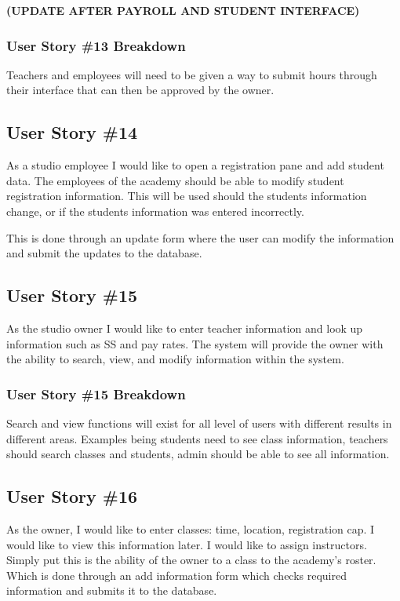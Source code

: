 \bf(UPDATE AFTER PAYROLL AND STUDENT INTERFACE)

\subsubsection{User Story \#13 Breakdown}
Teachers and employees will need to be given a way to submit hours through their interface that can then be approved by the owner.

\subsection{User Story \#14}
As a studio employee I would like to open a registration pane and add student data. The employees of the academy should be able to modify student registration information. This will be used should the students information change, or if the students information was entered incorrectly. 

This is done through an update form where the user can modify the information and submit the updates to the database.

\subsection{User Story \#15}
As the studio owner I would like to enter teacher information and look up information such as SS and pay rates. The system will provide the owner with the ability to search, view, and modify information within the system.

\subsubsection{User Story \#15 Breakdown}
Search and view functions will exist for all level of users with different results in different areas. Examples being students need to see class information, teachers should search classes and students, admin should be able to see all information.

\subsection{User Story \#16}
As the owner, I would like to enter classes: time, location, registration cap. I would like to view this information later. I would like to assign instructors. Simply put this is the ability of the owner to a class to the academy's roster. Which is done through an add information form which checks required information and submits it to the database. 

